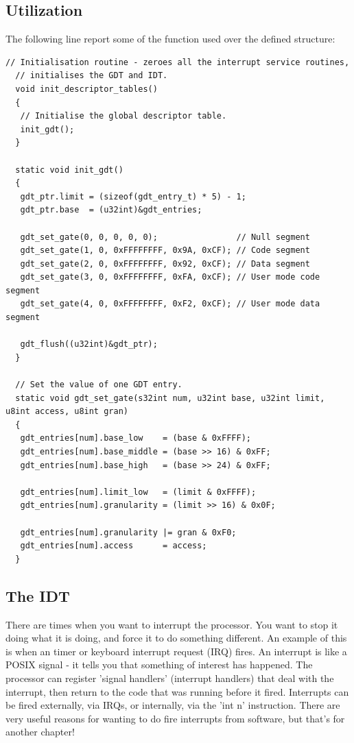 \documentclass[12pt]{article}
\begin{document}
\subsection{Utilization}
The following line report some of the function used over the defined structure:
\begin{lstlisting}[style=CStyle]
  // Initialisation routine - zeroes all the interrupt service routines,
  // initialises the GDT and IDT.
  void init_descriptor_tables()
  {
   // Initialise the global descriptor table.
   init_gdt();
  }

  static void init_gdt()
  {
   gdt_ptr.limit = (sizeof(gdt_entry_t) * 5) - 1;
   gdt_ptr.base  = (u32int)&gdt_entries;

   gdt_set_gate(0, 0, 0, 0, 0);                // Null segment
   gdt_set_gate(1, 0, 0xFFFFFFFF, 0x9A, 0xCF); // Code segment
   gdt_set_gate(2, 0, 0xFFFFFFFF, 0x92, 0xCF); // Data segment
   gdt_set_gate(3, 0, 0xFFFFFFFF, 0xFA, 0xCF); // User mode code segment
   gdt_set_gate(4, 0, 0xFFFFFFFF, 0xF2, 0xCF); // User mode data segment

   gdt_flush((u32int)&gdt_ptr);
  }

  // Set the value of one GDT entry.
  static void gdt_set_gate(s32int num, u32int base, u32int limit, u8int access, u8int gran)
  {
   gdt_entries[num].base_low    = (base & 0xFFFF);
   gdt_entries[num].base_middle = (base >> 16) & 0xFF;
   gdt_entries[num].base_high   = (base >> 24) & 0xFF;

   gdt_entries[num].limit_low   = (limit & 0xFFFF);
   gdt_entries[num].granularity = (limit >> 16) & 0x0F;

   gdt_entries[num].granularity |= gran & 0xF0;
   gdt_entries[num].access      = access;
  }
\end{lstlisting}

\subsection{The IDT}
There are times when you want to interrupt the processor. You want to stop it doing what it is doing, and force it to do something different. An example of this is when an timer or keyboard interrupt request (IRQ) fires. An interrupt is like a POSIX signal - it tells you that something of interest has happened. The processor can register 'signal handlers' (interrupt handlers) that deal with the interrupt, then return to the code that was running before it fired. Interrupts can be fired externally, via IRQs, or internally, via the 'int n' instruction. There are very useful reasons for wanting to do fire interrupts from software, but that's for another chapter!\\
\end{document}
